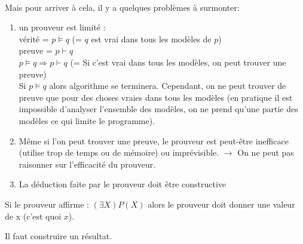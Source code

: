 \paragraph{}
Mais pour arriver à cela, il y a quelques problèmes à surmonter:
\begin{enumerate}\renewcommand {\theenumi }{\alph {enumi}}
	\item un prouveur est limité :\\
		vérité = $ p \models q $ (= $ q $ est vrai dans tous les modèles de $ p $)\\
		preuve = $ p  \vdash q $ \\
		$ p \models q \Rightarrow p \vdash q $ (= Si c’est vrai dans tous les modèles, on peut trouver une preuve)\\
		Si $ p \models q $ alors algorithme se terminera. Cependant, on ne peut trouver de preuve que pour des choses vraies dans tous les modèles (en pratique il est impossible d'analyser l'ensemble des modèles, on ne prend qu'une partie des modèles ce qui limite le programme).
		
		\item Même si l'on peut trouver une preuve, le prouveur est peut-être inefficace (utilise trop de temps ou de mémoire) ou imprévisible. $ \to $ On ne peut pas raisonner sur l'efficacité du prouveur.
		
		\item La déduction faite par le prouveur doit être constructive  
\end{enumerate}

		Si le prouveur affirme : $ (\exists X) P(X) $  alors le prouveur doit donner une valeur de x (c'est quoi $ x $).



Il faut construire un résultat.

